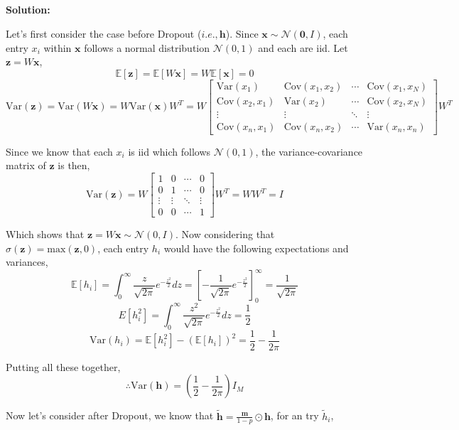 \documentclass{article}
\newenvironment{solution}
  {\par\noindent\textbf{Solution:}\par}
  {\par}
\begin{document}
\subsection{}
\begin{solution}
  Let's first consider the case before Dropout ($i.e., \textbf{h}$). Since $\textbf{x} \sim \mathcal{N}(\textbf{0}, I)$, 
  each entry $x_i$ within $\textbf{x}$ follows a normal distribution $\mathcal{N}(0,1)$ and each are iid.
  Let $\textbf{z} = W\textbf{x}$,
  $$\mathbb{E}[\textbf{z}] = \mathbb{E}[W\textbf{x}] = W\mathbb{E}[\textbf{x}] = 0$$
  $$\text{Var}(\textbf{z}) = \text{Var}(W\textbf{x}) = W\text{Var}(\textbf{x})W^T = W
  \begin{bmatrix} 
    \text{Var}(x_1) & \text{Cov}(x_1,x_2) & \cdots & \text{Cov}(x_1,x_N) \\ 
    \text{Cov}(x_2,x_1) & \text{Var}(x_2) & \cdots & \text{Cov}(x_2,x_N) \\ 
    \vdots & \vdots & \ddots & \vdots \\ 
    \text{Cov}(x_n,x_1) & \text{Cov}(x_n,x_2) & \cdots & \text{Var}(x_n,x_n) 
  \end{bmatrix}W^T$$

  Since we know that each $x_i$ is iid which follows $\mathcal{N}(0,1)$, the variance-covariance matrix of $\textbf{z}$ is then,
  $$\text{Var}(\textbf{z}) = W
  \begin{bmatrix}
    1 & 0 & \cdots & 0 \\ 
    0 & 1 & \cdots & 0 \\ 
    \vdots & \vdots & \ddots & \vdots \\ 
    0 & 0 & \cdots & 1
  \end{bmatrix}
  W^T = WW^T = I$$

  Which shows that $\textbf{z} = W\textbf{x} \sim \mathcal{N}(0,I)$. Now considering that $\sigma(\textbf{z}) = \text{max}(\textbf{z},0)$, each entry $h_i$ would have the following expectations and variances,
  $$\mathbb{E}[h_i] = \int_0^\infty \frac{z}{\sqrt{2\pi}}e^{-\frac{z^2}{2}}dz = \left[ -\frac{1}{\sqrt{2\pi}}e^{-\frac{z^2}{2}} \right]_0^\infty = \frac{1}{\sqrt{2\pi}}$$
  $$E[h_i^2] = \int_0^\infty \frac{z^2}{\sqrt{2\pi}}e^{-\frac{z^2}{2}}dz = \frac{1}{2}$$
  $$\text{Var}(h_i) = \mathbb{E}[h_i^2] - (\mathbb{E}[h_i])^2 = \frac{1}{2} - \frac{1}{2\pi}$$
  
  Putting all these together,
  $$\therefore \text{Var}(\textbf{h}) = \left(\frac{1}{2}-\frac{1}{2\pi}\right)I_M$$


  Now let's consider after Dropout, we know that $\tilde{\textbf{h}} = \frac{\textbf{m}}{1-p} \odot \textbf{h}$, for an try $\tilde{h}_i$,



\end{solution}
\end{document}

